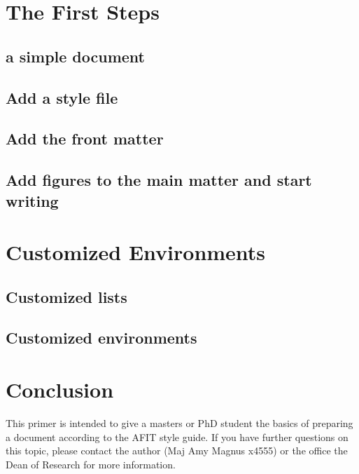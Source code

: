 \documentclass[12pt,letterpaper,oneside]{book}
\begin{document}
\frontmatter
	\flyleaf                        
	\disclaimerpage                 
	\titlepageAFIT                      
	\committeepage  
	
	\tableofcontents
	\listoffigures
	
\mainmatter
	
	\chapter{The First Steps}
		
		
		\figMyFirstLaTeX
		\section{\Latex a simple document}
		
		\figafitStyle

		\section{Add a style file}
		
		
		\section{Add the front matter}
		
		\figtitlePage

		\figmyFlypage
		
		\figmyFirstAbstract
		

		\section{Add figures to the main matter and start writing}
		\figmyFigures
		
		
		\figmyFirstFigures
		
		
	\chapter{Customized Environments}
		
		\section{Customized lists}
		
		\section{Customized environments}
		
		
	\chapter{Conclusion}
	         This primer is intended to give a masters or PhD student the basics of preparing a \Latex document according to the AFIT style guide\cite{AFITStyle}.  If you have further questions on this topic, please contact the author (Maj Amy Magnus x4555) or the office the Dean of Research for more information. \cite{dumBook,dumArticle}
	         
\backmatter
	\singlespace
	
	 
	\clearpage
\end{document}
